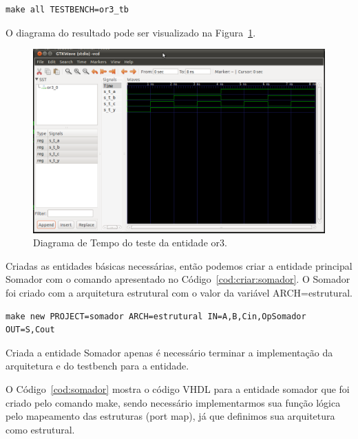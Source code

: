 \documentclass[a4paper,11pt]{report}
\begin{document}
\lstset{numbers=left, numberstyle=\tiny, stepnumber=1, numbersep=3pt}
\begin{lstlisting}[label=cod:testa:or3,caption=Comando para executar o testbench da entidade or3.]
  make all TESTBENCH=or3_tb
\end{lstlisting}

O diagrama do resultado pode ser visualizado na Figura~\ref{fig:gtw:or3}.

\begin{figure}[H]
\centering
\includegraphics[width=1\textwidth]{figuras/gtw_or3.png}
\caption{Diagrama de Tempo do teste da entidade or3.}
\label{fig:gtw:or3}
\end{figure}

Criadas as entidades básicas necessárias, então podemos criar a entidade principal Somador com o comando apresentado no Código~\ref{cod:criar:somador}. O Somador foi criado com a arquitetura estrutural com o valor da variável ARCH=estrutural.

\lstset{numbers=left, numberstyle=\tiny, stepnumber=1, numbersep=3pt}
\begin{lstlisting}[label=cod:criar:somador,caption=Comando para a criar a entidade Somador.]
  make new PROJECT=somador ARCH=estrutural IN=A,B,Cin,OpSomador OUT=S,Cout
\end{lstlisting}

Criada a entidade Somador apenas é necessário terminar a implementação da arquitetura e do testbench para a entidade.

O Código~\ref{cod:somador} mostra o código VHDL para a entidade somador que foi criado pelo comando make, sendo necessário implementarmos sua função lógica pelo mapeamento das estruturas (port map), já que definimos sua arquitetura como estrutural.
\end{document}
